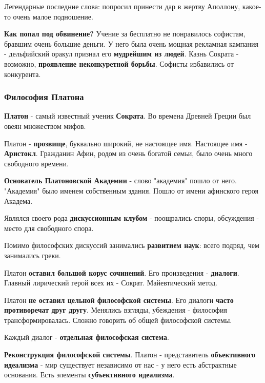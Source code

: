 \documentclass{article}
\begin{document}
\begin{flushleft}
\hfill

Легендарные последние слова: попросил принести дар в жертву Аполлону, какое-то очень малое подношение.

\hfill

\textbf{Как попал под обвинение?} Учение за бесплатно не понравилось софистам, бравшим очень большие деньги. У него была очень мощная рекламная кампания - дельфийский оракул признал его \textbf{мудрейшим из людей}. Казнь Сократа - возможно, \textbf{проявление неконкуретной борьбы}. Софисты избавились от конкурента.

\subsubsection{Философия Платона}

\textbf{Платон} - самый известный ученик \textbf{Сократа}. Во времена Древней Греции был овеян множеством мифов.

\hfill

Платон - \textbf{прозвище}, буквально широкий, не настоящее имя. Настоящее имя - \textbf{Аристокл}. Гражданин Афин, родом из очень богатой семьи, было очень много свободного времени.

\hfill

\textbf{Основатель Платоновской Академии} - слово "академия" пошло от него. "Академия" было именем собственным здания. Пошло от имени афинского героя Академа.

Являлся своего рода \textbf{дискуссионным клубом} - поощрались споры, обсуждения - место для свободного спора.

Помимо философских дискуссий занимались \textbf{развитием наук}: всего подряд, чем занимались греки.

\hfill

Платон \textbf{оставил большой корус сочинений}. Его произведения - \textbf{диалоги}. Главный лирический герой всех их - Сократ. Майевтический метод.

\hfill

Платон \textbf{не оставил цельной философской системы}. Его диалоги \textbf{часто противоречат друг другу}. Менялись взгляды, убеждения - философия трансформировалась. Сложно говорить об общей философской системы.

Каждый диалог - \textbf{отдельная философская система}.

\hfill

\textbf{Реконструкция философской системы}. Платон - представитель \textbf{объективного идеализма} - мир существует независимо от нас - у него есть абстрактные основания. Есть элементы \textbf{субъективного идеализма}.


\end{flushleft}
\end{document}
